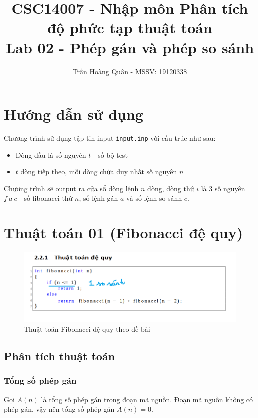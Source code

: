 \documentclass[12pt]{article}
\title{
	CSC14007 - Nhập môn Phân tích độ phức tạp thuật toán\\
	Lab 02 - Phép gán và phép so sánh
}
\author{Trần Hoàng Quân - MSSV: 19120338}
\begin{document}
\maketitle
\tableofcontents
\pagebreak

\section{Hướng dẫn sử dụng}
Chương trình sử dụng tập tin input \texttt{input.inp} với cấu trúc như sau:
\begin{itemize}
    \item Dòng đầu là số nguyên $t$ - số bộ test
    \item $t$ dòng tiếp theo, mỗi dòng chứa duy nhất số nguyên $n$
\end{itemize}

Chương trình sẽ output ra cửa sổ dòng lệnh $n$ dòng, dòng thứ $i$ là 3 số nguyên $f\ a\ c$ - số fibonacci thứ $n$, số lệnh gán $a$ và số lệnh so sánh $c$.
\section{Thuật toán 01 (Fibonacci đệ quy)}
\begin{figure}[H]
\centering
\includegraphics[]{fibo-de-quy.png}
\caption{Thuật toán Fibonacci đệ quy theo đề bài}
\end{figure}
\subsection{Phân tích thuật toán}
\subsubsection{Tổng số phép gán}
Gọi $A(n)$ là tổng số phép gán trong đoạn mã nguồn. Đoạn mã nguồn không có phép gán, vậy nên tổng số phép gán $A(n) = 0$.
\end{document}
